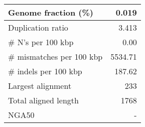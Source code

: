 \documentclass[12pt,a4paper]{article}
\begin{document}
\begin{table}[ht]
\begin{center}
\begin{tabular}{|l*{1}{|r}|}
Genome fraction (\%) & 0.019 \\ \hline
Duplication ratio & 3.413 \\ \hline
\# N's per 100 kbp & 0.00 \\ \hline
\# mismatches per 100 kbp & 5534.71 \\ \hline
\# indels per 100 kbp & 187.62 \\ \hline
Largest alignment & 233 \\ \hline
Total aligned length & 1768 \\ \hline
NGA50 & - \\ \hline
\end{tabular}
\end{center}
\end{table}
\end{document}
